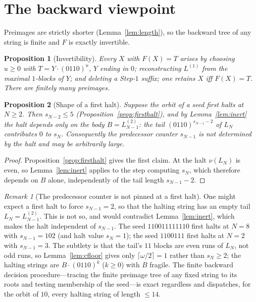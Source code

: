 \documentclass[11pt,reqno]{amsart}
\theoremstyle{plain}
\newtheorem{proposition}{Proposition}
\theoremstyle{definition}
\theoremstyle{remark}
\newtheorem{remark}{Remark}
\begin{document}
\section{The backward viewpoint}\label{sec:backward}
Preimages are strictly shorter (Lemma~\ref{lem:length}), so the backward tree of any string is finite and $F$ is exactly invertible.

\begin{proposition}[Invertibility]\label{prop:inv}
Every $X$ with $F(X)=T$ arises by choosing $u\ge 0$ with $T=Y\cdot(0110)^u$, $Y$ ending in $0$; reconstructing $L^{(1)}$ from the maximal $1$-blocks of $Y$; and deleting a Step-$1$ suffix; one retains $X$ iff $F(X)=T$. There are finitely many preimages.
\end{proposition}

\begin{proposition}[Shape of a first halt]\label{prop:halt-shape}
Suppose the orbit of a seed first halts at $N\ge 2$. Then $s_{N-2}\le 5$ (Proposition~\ref{prop:firsthalt}), and by Lemma~\ref{lem:inert} the halt depends only on the body $B=L^{(2)}_{N-1}$: the tail $(0110)^{s_{N-1}-2}$ of $L_N$ contributes $0$ to $s_N$. Consequently the predecessor counter $s_{N-1}$ is not determined by the halt and may be arbitrarily large.
\end{proposition}
\begin{proof}
Proposition~\ref{prop:firsthalt} gives the first claim. At the halt $\nu(L_N)$ is even, so Lemma~\ref{lem:inert} applies to the step computing $s_N$, which therefore depends on $B$ alone, independently of the tail length $s_{N-1}-2$.
\end{proof}

\begin{remark}[The predecessor counter is not pinned at a first halt]\label{rem:rem31}
One might expect a first halt to force $s_{N-1}=2$, so that the halting string has an empty tail $L_N=L^{(2)}_{N-1}$. This is not so, and would contradict Lemma~\ref{lem:inert}, which makes the halt independent of $s_{N-1}$. The seed $110011111110$ first halts at $N=8$ with $s_{N-1}=102$ (and halt value $s_N=1$); the seed $1100111$ first halts at $N=2$ with $s_{N-1}=3$. The subtlety is that the tail's $11$ blocks are even runs of $L_N$, not odd runs, so Lemma~\ref{lem:cfloor} gives only $\lceil\omega/2\rceil=1$ rather than $s_N\ge 2$; the halting strings are $B\cdot(0110)^k$ ($k\ge 0$) with $B$ fragile. The finite backward decision procedure---tracing the finite preimage tree of any fixed string to its roots and testing membership of the seed---is exact regardless and dispatches, for the orbit of $10$, every halting string of length $\le 14$.
\end{remark}
\end{document}
